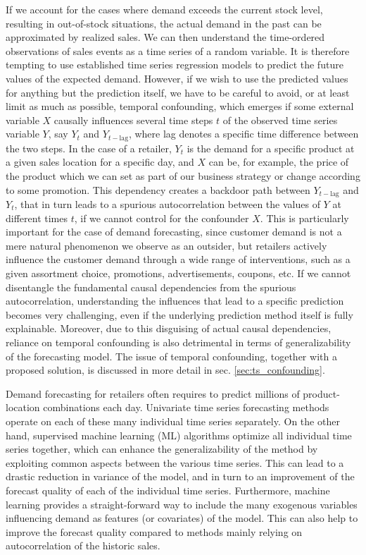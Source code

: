 \documentclass[BCOR=1mm, DIV=calc,10pt,
twoside=true,
twocolumn,
headings=normal]{scrartcl}
\begin{document}
If we account for the cases where demand exceeds the current stock level, resulting in out-of-stock situations, the actual demand in the past can be approximated by realized sales. We can then understand the time-ordered observations of sales events as a time series of a random variable. It is therefore tempting to use established time series regression models to predict the future values of the expected demand. However, if we wish to use the predicted values for anything but the prediction itself, we have to be careful to avoid, or at least limit as much as possible, temporal confounding, which emerges if some external variable $X$ causally influences several time steps $t$ of the observed time series variable $Y$, say $Y_{t}$ and $Y_{t-\mathrm{lag}}$, where lag denotes a specific time difference between the two steps. In the case of a retailer, $Y_{t}$ is the demand for a specific product at a given sales location for a specific day, and $X$ can be, for example, the price of the product which we can set as part of our business strategy or change according to some promotion. This dependency creates a backdoor path between $Y_{t-\mathrm{lag}}$ and $Y_{t}$, that in turn leads to a spurious autocorrelation between the values of $Y$ at different times $t$, if we cannot control for the confounder $X$. This is particularly important for the case of demand forecasting, since customer demand is not a mere natural phenomenon we observe as an outsider, but retailers actively influence the customer demand  through a wide range of interventions, such as a given assortment choice, promotions, advertisements, coupons, etc. If we cannot disentangle the fundamental causal dependencies from the spurious autocorrelation, understanding the influences that lead to a specific prediction becomes very challenging, even if the underlying prediction method itself is fully explainable. Moreover, due to this disguising of actual causal dependencies, reliance on temporal confounding is also detrimental in terms of generalizability of the forecasting model. The issue of temporal confounding, together with a proposed solution, is discussed in more detail in sec. \ref{sec:ts_confounding}.

Demand forecasting for retailers often requires to predict millions of product-location combinations each day. Univariate time series forecasting methods operate on each of these many individual time series separately. On the other hand, supervised machine learning (ML) algorithms optimize all individual time series together, which can enhance the generalizability of the method by exploiting common aspects between the various time series. This can lead to a drastic reduction in variance of the model, and in turn to an improvement of the forecast quality of each of the individual time series. Furthermore, machine learning provides a straight-forward way to include the many exogenous variables influencing demand as features (or covariates) of the model. This can also help to improve the forecast quality compared to methods mainly relying on autocorrelation of the historic sales.
\end{document}
